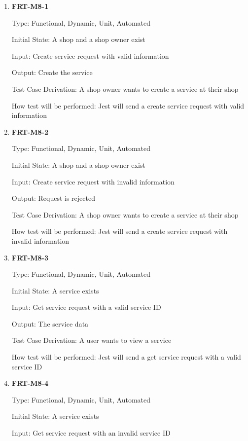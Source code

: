 \documentclass[12pt, titlepage]{article}
\begin{document}
\begin{enumerate}

	\item \textbf{FRT-M8-1}

	      Type: Functional, Dynamic, Unit, Automated

	      Initial State: A shop and a shop owner exist

	      Input: Create service request with valid information

	      Output: Create the service

	      Test Case Derivation: A shop owner wants to create a service at their shop

	      How test will be performed: Jest will send a create service request with valid information

	\item \textbf{FRT-M8-2}

	      Type: Functional, Dynamic, Unit, Automated

	      Initial State: A shop and a shop owner exist

	      Input: Create service request with invalid information

	      Output: Request is rejected

	      Test Case Derivation: A shop owner wants to create a service at their shop

	      How test will be performed: Jest will send a create service request with invalid information

	\item \textbf{FRT-M8-3}

	      Type: Functional, Dynamic, Unit, Automated

	      Initial State: A service exists

	      Input: Get service request with a valid service ID

	      Output: The service data

	      Test Case Derivation: A user wants to view a service

	      How test will be performed: Jest will send a get service request with a valid service ID

	\item \textbf{FRT-M8-4}

	      Type: Functional, Dynamic, Unit, Automated

	      Initial State: A service exists

	      Input: Get service request with an invalid service ID


\end{enumerate}
\end{document}
